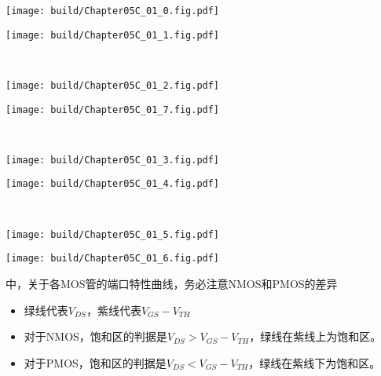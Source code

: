 \begin{Figure}[五管运算跨导放大器的差模特性]
    \begin{FigureSub}
        \texttt{[image: build/Chapter05C\_01\_0.fig.pdf]}
    \end{FigureSub} \hspace{0.2cm}
    \begin{FigureSub}
        \texttt{[image: build/Chapter05C\_01\_1.fig.pdf]}
    \end{FigureSub} \\ \vspace{0.5cm}
    \begin{FigureSub}
        \texttt{[image: build/Chapter05C\_01\_2.fig.pdf]}
    \end{FigureSub} \hspace{0.2cm}
    \begin{FigureSub}[$M_5$管;五管差模5]
        \texttt{[image: build/Chapter05C\_01\_7.fig.pdf]}
    \end{FigureSub} \\ \vspace{0.5cm}
    \begin{FigureSub}[$M_1$管;五管差模1]
        \texttt{[image: build/Chapter05C\_01\_3.fig.pdf]}
    \end{FigureSub} \hspace{0.2cm}
    \begin{FigureSub}[$M_2$管;五管差模2]
        \texttt{[image: build/Chapter05C\_01\_4.fig.pdf]}
    \end{FigureSub} \\ \vspace{0.5cm}
    \begin{FigureSub}[$M_3$管;五管差模3]
        \texttt{[image: build/Chapter05C\_01\_5.fig.pdf]}
    \end{FigureSub} \hspace{0.2cm}
    \begin{FigureSub}[$M_4$管;五管差模4]
        \texttt{[image: build/Chapter05C\_01\_6.fig.pdf]}
    \end{FigureSub}
\end{Figure}

中，关于各MOS管的端口特性曲线，务必注意NMOS和PMOS的差异
\begin{itemize}
    \item 绿线代表$V_{DS}$，紫线代表$V_{GS}-V_{TH}$
    \item 对于NMOS，饱和区的判据是$V_{DS}>V_{GS}-V_{TH}$，绿线在紫线上为饱和区。
    \item 对于PMOS，饱和区的判据是$V_{DS}<V_{GS}-V_{TH}$，绿线在紫线下为饱和区。
\end{itemize}

